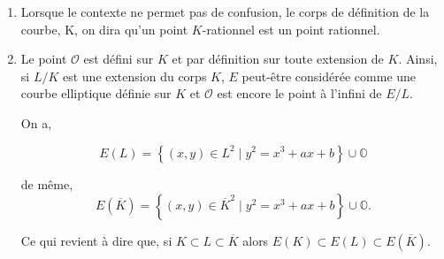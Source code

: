 \begin{remarque}
    \begin{enumerate}
        \item 
    Lorsque le contexte ne permet pas de confusion, le corps de définition de la courbe, K, on
    dira qu'un point $K$-rationnel est un point rationnel.
        \item Le point $\mathcal{O}$ est défini sur $K$ et par définition sur toute
            extension de $K$. Ainsi, si $L / K$ est une extension du corps $K$, $E$
            peut-être considérée comme une courbe elliptique définie sur $K$ et $\mathcal{O}$
            est encore le point à l'infini de $E / L$.

            On a,

            \[
            E(L) = \left\{ (x,y) \in L^2 \mid y^2 = x^3 + ax + b \right\} \cup {\mathbb{O}}
            \] 

            de même,
            \[
            E(\overline{K}) = \left\{ (x,y) \in \overline{K}^2 \mid y^2 = x^3 +
            ax + b \right\} \cup {\mathbb{O}}
            .\] 

            Ce qui revient à dire que, si $K \subset L \subset \overline{K}$ alors $E(K)
            \subset E(L) \subset E(\overline{K})$.
    \end{enumerate}
\end{remarque}

